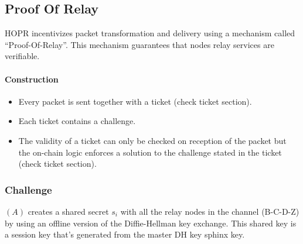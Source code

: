 \subsection{Proof Of Relay}
\label{ProofOfRelay}
HOPR incentivizes packet transformation and delivery using a mechanism called “Proof-Of-Relay”. This mechanism guarantees that nodes relay services are verifiable.
\paragraph{Construction}
\begin{itemize}
    \item Every packet is sent together with a ticket (check ticket section).
    \item Each ticket contains a challenge.
    \item The validity of a ticket can only be checked on reception of the packet but the on-chain logic enforces a solution to the challenge stated in the ticket (check ticket section).
\end{itemize}

\subsubsection{Challenge}
$(A)$ creates a shared secret $s_i$ with all the relay nodes in the channel (B-C-D-Z) by using an offline version of the Diffie-Hellman key exchange. This shared key is a session key that's generated from the master DH key sphinx key.
